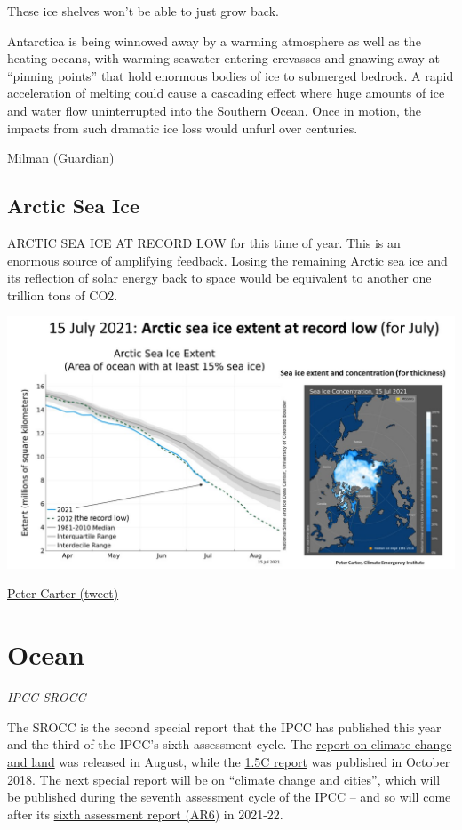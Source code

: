 \documentclass[
]{book}
\begin{document}
These ice shelves won't be able to just grow back.

Antarctica is being winnowed away by a warming atmosphere as well as the heating oceans, with warming seawater entering crevasses and gnawing away at ``pinning points'' that hold enormous bodies of ice to submerged bedrock. A rapid acceleration of melting could cause a cascading effect where huge amounts of ice and water flow uninterrupted into the Southern Ocean.
Once in motion, the impacts from such dramatic ice loss would unfurl over centuries.

\href{https://www.theguardian.com/environment/2021/may/05/antarctica-ice-sheet-melting-global-heating-sea-level-rise-study}{Milman (Guardian)}

\hypertarget{arctic-sea-ice}{%
\section{Arctic Sea Ice}\label{arctic-sea-ice}}

ARCTIC SEA ICE AT RECORD LOW for this time of year. This is an enormous source of amplifying feedback. Losing the remaining Arctic sea ice and its reflection of solar energy back to space would be equivalent to another one trillion tons of CO2.

\includegraphics{fig/Arctic_Sea_Ice_2107715.jpeg}

\href{https://twitter.com/PCarterClimate/status/1416264975522295809/photo/1}{Peter Carter (tweet)}

\hypertarget{ocean}{%
\chapter{Ocean}\label{ocean}}

\emph{IPCC SROCC}

The SROCC is the second special report that the IPCC has published this year and the third of the IPCC's sixth assessment cycle. The \href{https://www.carbonbrief.org/in-depth-qa-the-ipccs-special-report-on-climate-change-and-land}{report on climate change and land} was released in August, while the \href{https://www.carbonbrief.org/in-depth-qa-ipccs-special-report-on-climate-change-at-one-point-five-c}{1.5C report} was published in October 2018. The next special report will be on ``climate change and cities'', which will be published during the seventh assessment cycle of the IPCC -- and so will come after its \href{https://www.ipcc.ch/assessment-report/ar6/}{sixth assessment report (AR6)} in 2021-22.
\end{document}
